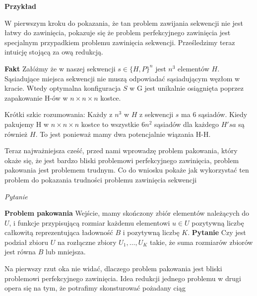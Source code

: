 \documentclass[leqno,10pt]{article}
\def\marg#1{\marginpar{\scriptsize\raggedright#1}}
\begin{document}
\textbf{Przykład}



W pierwszym kroku do pokazania, że tan problem zawijania sekwencji nie jest łatwy do zawinięcia, pokazuje się że problem perfekcyjnego zawinięcia jest specjalnym przypadkiem problemu zawinięcia sekwencji. Prześledzimy teraz intuicję stojącą za ową redukcją. 

\textbf{Fakt} \newline 
Załóżmy że w naszej sekwencji $s \in \{H,P\}^{n}$ jest $n^{3}$ elementów $H$. Sąsiadujące miejsca sekwencji nie muszą odpowiadać sąsiadującym węzłom w kracie. Wtedy optymalna konfiguracja $S$ w G jest unikalnie osiągnięta poprzez zapakowanie H-ów w $n\times n \times n$ kostce.

Krótki szkic rozumowania:
Każdy z $n^{3}$ w $H$ z sekwencji $s$ ma 6 sąsiadów. Kiedy pakujemy H w $n\times n \times n$ kostce to wszystkie $6n^2$ sąsiadów dla każdego $H'sa$ są również $H$. To jest ponieważ mamy dwa potencjalnie wiązania H-H. 



Teraz najważniejsza cześć, przed nami wprowadzę problem pakowania, który okaże się, że jest bardzo bliski problemowi perfekcyjnego zawinięcia, problem pakowania jest problemem trudnym. 
Co do wniosku pokaże jak wykorzystać ten problem do pokazania trudności problemu zawinięcia sekwencji

\textit{Pytanie}


\textbf{Problem pakowania}
Wejście, mamy skończony zbiór elementów należących do $U$, i funkcje przypisującą rozmiar każdemu elementowi $u \in U$ pozytywną liczbę całkowitą reprezentująca ładowność $B$ i pozytywną liczbę $K$. 
\newline 
\textbf{Pytanie}
Czy jest podział zbioru $U$ na rozłączne zbiory $U_1, \ldots, U_K$ takie, że suma rozmiarów zbiorów jest równa $B$ lub mniejsza. 

Na pierwszy rzut oka nie widać, dlaczego problem pakowania jest bliski problemowi perfekcyjnego zawinięcia. Idea redukcji jednego problemu w drugi opera się na tym, że potrafimy skonsturować pożadany ciąg  




\marg{ 
}
\end{document}
